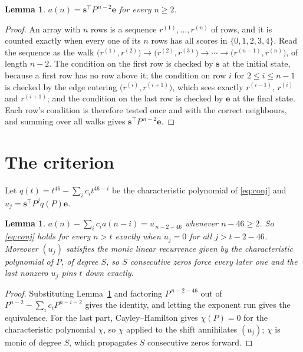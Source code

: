 \documentclass[11pt,a4paper]{article}
\theoremstyle{plain}
\newtheorem{lemma}[theorem]{Lemma}
\theoremstyle{definition}
\begin{document}
\begin{lemma}\label{lem:walk}
$a(n)=\mathbf{s}^{\!\top}P^{\,n-2}\mathbf{e}$ for every $n\ge2$.
\end{lemma}

\begin{proof}
An array with $n$ rows is a sequence $r^{(1)},\dots,r^{(n)}$ of rows, and it is counted
exactly when every one of its $n$ rows has all scores in $\{0,1,2,3,4\}$. Read the sequence as the
walk $\bigl(r^{(1)},r^{(2)}\bigr)\to\bigl(r^{(2)},r^{(3)}\bigr)\to\cdots\to
\bigl(r^{(n-1)},r^{(n)}\bigr)$, of length $n-2$. The condition on the first row is
checked by $\mathbf{s}$ at the initial state, because a first row has no row above it; the
condition on row $i$ for $2\le i\le n-1$ is checked by the edge entering
$\bigl(r^{(i)},r^{(i+1)}\bigr)$, which sees exactly $r^{(i-1)}$, $r^{(i)}$ and
$r^{(i+1)}$; and the condition on the last row is checked by $\mathbf{e}$ at the final
state. Each row's condition is therefore tested once and with the correct neighbours, and
summing over all walks gives $\mathbf{s}^{\!\top}P^{\,n-2}\mathbf{e}$.
\end{proof}

\section{The criterion}

Let $q(t)=t^{46}-\sum_i c_i t^{46-i}$ be the characteristic polynomial of
\eqref{eq:conj} and $u_j=\mathbf{s}^{\!\top}P^{j}q(P)\mathbf{e}$.

\begin{lemma}\label{lem:crit}
$a(n)-\sum_i c_i a(n-i)=u_{\,n-2-46}$ whenever $n-46\ge2$. So \eqref{eq:conj}
holds for every $n>t$ exactly when $u_j=0$ for all $j>t-2-46$. Moreover $(u_j)$
satisfies the monic linear recurrence given by the characteristic polynomial of $P$, of
degree $S$, so $S$ consecutive zeros force every later one and the last nonzero $u_j$ pins
$t$ down exactly.
\end{lemma}

\begin{proof}
Substituting Lemma~\ref{lem:walk} and factoring $P^{\,n-2-46}$ out of
$P^{n-2}-\sum_i c_i P^{n-i-2}$ gives the identity, and letting the exponent run gives the
equivalence. For the last part, Cayley--Hamilton gives $\chi(P)=0$ for the characteristic
polynomial $\chi$, so $\chi$ applied to the shift annihilates $(u_j)$; $\chi$ is monic of
degree $S$, which propagates $S$ consecutive zeros forward.
\end{proof}
\end{document}

